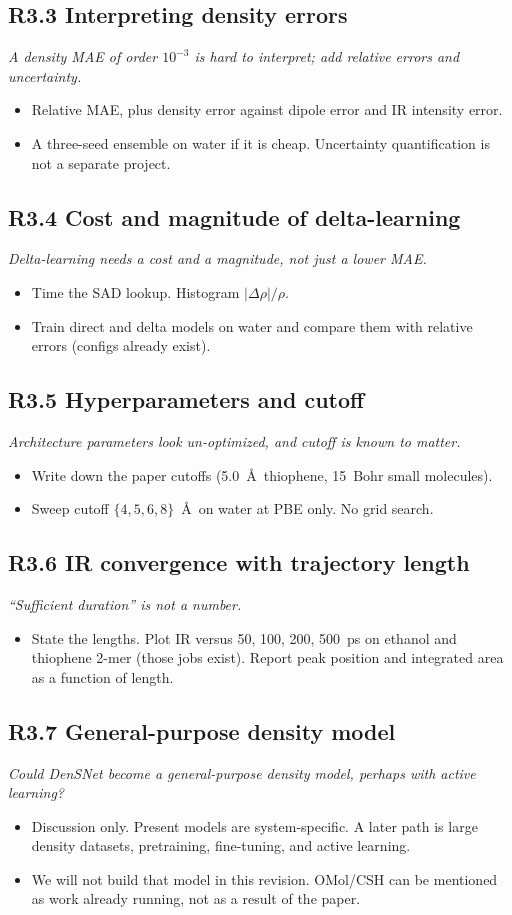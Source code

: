 \documentclass[11pt]{article}
\newcommand{\revpoint}[1]{\textit{#1}\par\nopagebreak\vspace{0.35em}}
\newcommand{\revhead}[1]{\subsection*{#1}}
\begin{document}
\revhead{R3.3 Interpreting density errors}
\revpoint{A density MAE of order $10^{-3}$ is hard to interpret; add relative errors and uncertainty.}
\begin{itemize}
  \item Relative MAE, plus density error against dipole error and IR intensity error.
  \item A three-seed ensemble on water if it is cheap. Uncertainty quantification is
        not a separate project.
\end{itemize}

\revhead{R3.4 Cost and magnitude of delta-learning}
\revpoint{Delta-learning needs a cost and a magnitude, not just a lower MAE.}
\begin{itemize}
  \item Time the SAD lookup. Histogram $|\Delta\rho|/\rho$.
  \item Train direct and delta models on water and compare them with relative errors
        (configs already exist).
\end{itemize}

\revhead{R3.5 Hyperparameters and cutoff}
\revpoint{Architecture parameters look un-optimized, and cutoff is known to matter.}
\begin{itemize}
  \item Write down the paper cutoffs (5.0~\AA\ thiophene, 15~Bohr small molecules).
  \item Sweep cutoff $\{4,5,6,8\}$~\AA\ on water at PBE only. No grid search.
\end{itemize}

\revhead{R3.6 IR convergence with trajectory length}
\revpoint{``Sufficient duration'' is not a number.}
\begin{itemize}
  \item State the lengths. Plot IR versus 50, 100, 200, 500~ps on ethanol and
        thiophene 2-mer (those jobs exist). Report peak position and integrated area
        as a function of length.
\end{itemize}

\revhead{R3.7 General-purpose density model}
\revpoint{Could DenSNet become a general-purpose density model, perhaps with active learning?}
\begin{itemize}
  \item Discussion only. Present models are system-specific. A later path is large
        density datasets, pretraining, fine-tuning, and active learning.
  \item We will not build that model in this revision. OMol/CSH can be mentioned as
        work already running, not as a result of the paper.
\end{itemize}
\end{document}
